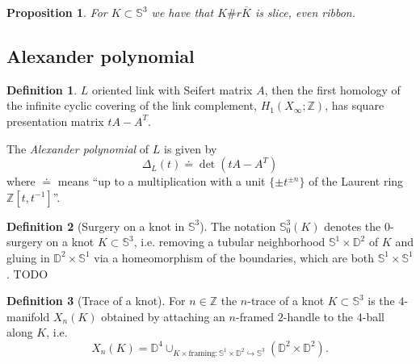 \documentclass{tufte-book} %
\newtheorem{proposition}{Proposition}
\theoremstyle{definition}
\newtheorem{definition}{Definition}
\theoremstyle{remark}
\newtheorem{remark}{Remark}
\newcommand{\sphere}[1]{\mathbb{S}^{#1}}
\newcommand{\disk}[1]{\mathbb{D}^{#1}}
\newcommand{\Z}{\mathbb{Z}}
\begin{document}
\begin{proposition}
	For $K \subset \sphere{3}$ we have that
	$K \# r \overline{K}$ is slice, even ribbon.
\end{proposition}


\subsection{Alexander polynomial}

\begin{definition}
	$L$ oriented link with Seifert matrix $A$, then the first homology of
	the infinite cyclic covering of the link complement, $H_1(X_{\infty} ; \Z)$,
	has square presentation matrix $t A - A^{T}$.
	
	The \textit{Alexander polynomial} of $L$ is given by
	\begin{equation*}
		\Delta_{L}(t) \doteq \det(t A - A^{T})
	\end{equation*}
	where $\doteq$ means ``up to a multiplication with a unit $\{ \pm t^{\pm n} \}$
	of the Laurent ring $\Z[t, t^{-1}]$''.
	\marginnote{
		\begin{remark}
			$\Z[t^{\pm 1}]$ is \textbf{not} a PID.
		\end{remark}
	}
\end{definition}

\begin{definition}[Surgery on a knot in $\sphere{3}$]
	The notation $\sphere{3}_{0}(K)$ denotes the $0$-surgery on a knot
	$K \subset \sphere{3}$, i.e. removing a tubular neighborhood
	$\sphere{1} \times \disk{2}$ of $K$ and gluing in $\disk{2} \times \sphere{1}$
	via a homeomorphism of the boundaries, which are both $\sphere{1} \times \sphere{1}$.
	TODO %
\end{definition}

\begin{definition}[Trace of a knot]
	For $n \in \Z$ the $n$-trace of a knot 
	$K \subset \sphere{3}$
	is the $4$-manifold $X_{n}(K)$ obtained by attaching an $n$-framed $2$-handle to the $4$-ball along $K$,
	i.e. 
	\begin{equation*}
		X_{n}(K) = \disk{4} \cup_{K \times \textrm{framing} \colon \sphere{1} \times \disk{2} \hookrightarrow \sphere{3}} (\disk{2} \times \disk{2}).
	\end{equation*}
\end{definition}
\end{document}
